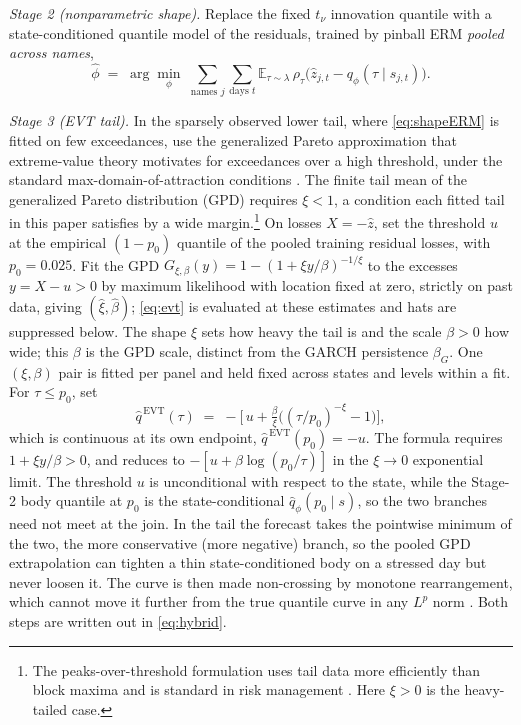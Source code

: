 \documentclass[11pt]{article}
\theoremstyle{remark}
\begin{document}
\emph{Stage 2 (nonparametric shape).} Replace the fixed $t_\nu$
innovation quantile with a state-conditioned quantile model of the
residuals, trained by pinball ERM \emph{pooled across names},
\begin{equation}
\widehat{\phi} \;=\; \arg\min_{\phi}\;
\sum_{\text{names } j}\sum_{\text{days } t}
\mathbb{E}_{\tau\sim\lambda}\,
\rho_\tau\!\big(\widehat{z}_{j,t} - q_\phi(\tau \mid s_{j,t})\big).
\label{eq:shapeERM}
\end{equation}

\emph{Stage 3 (EVT tail).} In the sparsely observed lower tail, where
\eqref{eq:shapeERM} is fitted on few exceedances, use the generalized Pareto
approximation that extreme-value theory motivates for exceedances over
a high threshold, under the standard max-domain-of-attraction
conditions \citep{balkema1974, pickands1975, mcneilfrey2000}. The finite tail mean of the generalized Pareto distribution (GPD) requires $\xi<1$, a condition each fitted tail in this paper
satisfies by a wide margin.\footnote{The peaks-over-threshold formulation \citep{balkema1974,pickands1975} uses tail data more efficiently than block maxima \citep{embrechts1997} and is standard in risk management \citep{mcneilfrey2000}. Here $\xi>0$ is the heavy-tailed case.} On losses $X=-\widehat{z}$, set the threshold $u$ at the empirical $(1-p_0)$ quantile of the pooled training residual losses, with $p_0 = 0.025$. Fit the GPD $G_{\xi,\beta}(y) = 1-(1+\xi y/\beta)^{-1/\xi}$ to the excesses $y = X - u > 0$ by maximum likelihood with location fixed at zero, strictly on past data, giving $(\widehat\xi,\widehat\beta)$; \eqref{eq:evt} is evaluated at these estimates and hats are suppressed below. The shape $\xi$ sets how heavy the tail is and the scale $\beta>0$ how wide; this $\beta$ is the GPD scale, distinct from the GARCH persistence $\beta_G$. One $(\xi,\beta)$ pair is fitted per panel and held fixed across states and levels within a fit. For $\tau \le p_0$, set
\begin{equation}
\widehat{q}^{\,\mathrm{EVT}}(\tau)
\;=\; -\Big[\, u + \tfrac{\beta}{\xi}\big( (\tau/p_0)^{-\xi} - 1 \big)
\Big],
\label{eq:evt}
\end{equation}
which is continuous at its own endpoint, $\widehat q^{\,\mathrm{EVT}}(p_0) = -u$. The formula requires $1+\xi y/\beta>0$, and reduces to $-[u+\beta\log(p_0/\tau)]$ in the $\xi\to0$ exponential limit. The threshold $u$ is unconditional with respect to the state, while the Stage-2 body quantile at $p_0$ is the state-conditional $\widehat q_\phi(p_0\mid s)$, so the two branches need not meet at the join. In the tail the forecast takes the pointwise minimum of the two, the more conservative (more negative) branch, so the pooled GPD extrapolation can tighten a thin state-conditioned body on a stressed day but never loosen it. The curve is then made non-crossing by monotone rearrangement, which cannot move it further from the true quantile curve in any $L^p$ norm \citep{cherno2010rearr}. Both steps are written out in \eqref{eq:hybrid}.
\end{document}
